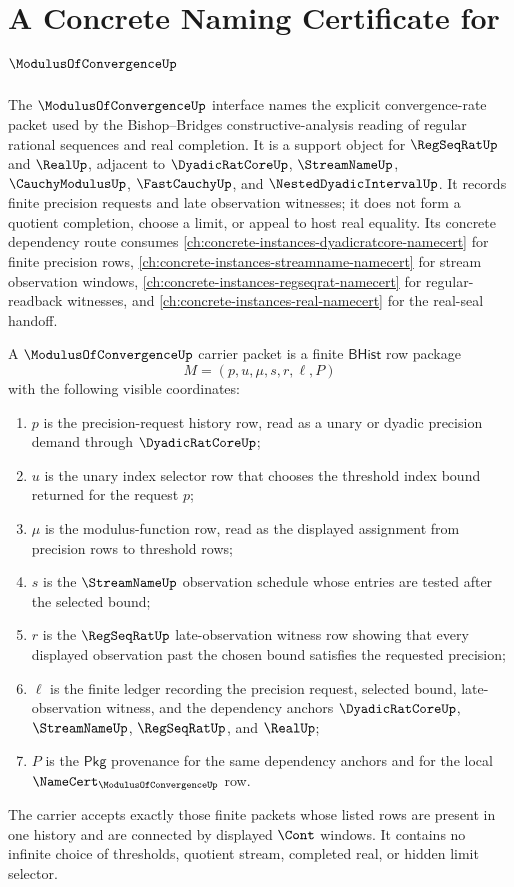 \chapter{A Concrete Naming Certificate for $\ModulusOfConvergenceUp$}
\label{ch:concrete-instances-modulusofconvergence-namecert}

The $\ModulusOfConvergenceUp$ interface names the explicit convergence-rate
packet used by the Bishop--Bridges constructive-analysis reading of regular
rational sequences and real completion. It is a support object for
$\RegSeqRatUp$ and $\RealUp$, adjacent to $\DyadicRatCoreUp$,
$\StreamNameUp$, $\CauchyModulusUp$, $\FastCauchyUp$, and
$\NestedDyadicIntervalUp$. It records finite precision requests and late
observation witnesses; it does not form a quotient completion, choose a limit,
or appeal to host real equality.
Its concrete dependency route consumes \autoref{ch:concrete-instances-dyadicratcore-namecert} for finite precision rows, \autoref{ch:concrete-instances-streamname-namecert} for stream observation windows, \autoref{ch:concrete-instances-regseqrat-namecert} for regular-readback witnesses, and \autoref{ch:concrete-instances-real-namecert} for the real-seal handoff.

\begin{definition}\label{def:modulusofconvergence-bhist-carrier}
A $\ModulusOfConvergenceUp$ carrier packet is a finite $\mathsf{BHist}$ row
package
$$
M=(p,u,\mu,s,r,\ell,P)
$$
with the following visible coordinates:
\begin{enumerate}
\item $p$ is the precision-request history row, read as a unary or dyadic
precision demand through $\DyadicRatCoreUp$;
\item $u$ is the unary index selector row that chooses the threshold index bound
returned for the request $p$;
\item $\mu$ is the modulus-function row, read as the displayed assignment from
precision rows to threshold rows;
\item $s$ is the $\StreamNameUp$ observation schedule whose entries are tested
after the selected bound;
\item $r$ is the $\RegSeqRatUp$ late-observation witness row showing that every
displayed observation past the chosen bound satisfies the requested precision;
\item $\ell$ is the finite ledger recording the precision request, selected
bound, late-observation witness, and the dependency anchors
$\DyadicRatCoreUp$, $\StreamNameUp$, $\RegSeqRatUp$, and $\RealUp$;
\item $P$ is the $\mathsf{Pkg}$ provenance for the same dependency anchors and
for the local $\NameCert_{\ModulusOfConvergenceUp}$ row.
\end{enumerate}
The carrier accepts exactly those finite packets whose listed rows are present
in one history and are connected by displayed $\Cont$ windows. It contains no
infinite choice of thresholds, quotient stream, completed real, or hidden limit
selector.
\end{definition}

